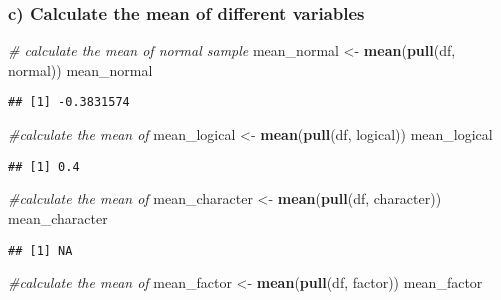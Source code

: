 \documentclass[
]{article}
\newenvironment{Shaded}{\begin{snugshade}}{\end{snugshade}}
\newcommand{\CommentTok}[1]{\textcolor[rgb]{0.56,0.35,0.01}{\textit{#1}}}
\newcommand{\FunctionTok}[1]{\textcolor[rgb]{0.13,0.29,0.53}{\textbf{#1}}}
\newcommand{\NormalTok}[1]{#1}
\newcommand{\OtherTok}[1]{\textcolor[rgb]{0.56,0.35,0.01}{#1}}
\begin{document}
\subsubsection{c) Calculate the mean of different
variables}\label{c-calculate-the-mean-of-different-variables}

\begin{Shaded}
\begin{Highlighting}[]
\CommentTok{\# calculate the mean of normal sample}
\NormalTok{mean\_normal }\OtherTok{\textless{}{-}} \FunctionTok{mean}\NormalTok{(}\FunctionTok{pull}\NormalTok{(df, normal))}
\NormalTok{mean\_normal}
\end{Highlighting}
\end{Shaded}

\begin{verbatim}
## [1] -0.3831574
\end{verbatim}

\begin{Shaded}
\begin{Highlighting}[]
\CommentTok{\#calculate the mean of }
\NormalTok{mean\_logical }\OtherTok{\textless{}{-}} \FunctionTok{mean}\NormalTok{(}\FunctionTok{pull}\NormalTok{(df, logical))}
\NormalTok{mean\_logical}
\end{Highlighting}
\end{Shaded}

\begin{verbatim}
## [1] 0.4
\end{verbatim}

\begin{Shaded}
\begin{Highlighting}[]
\CommentTok{\#calculate the mean of }
\NormalTok{mean\_character }\OtherTok{\textless{}{-}} \FunctionTok{mean}\NormalTok{(}\FunctionTok{pull}\NormalTok{(df, character))}
\NormalTok{mean\_character}
\end{Highlighting}
\end{Shaded}

\begin{verbatim}
## [1] NA
\end{verbatim}

\begin{Shaded}
\begin{Highlighting}[]
\CommentTok{\#calculate the mean of }
\NormalTok{mean\_factor }\OtherTok{\textless{}{-}} \FunctionTok{mean}\NormalTok{(}\FunctionTok{pull}\NormalTok{(df, factor))}
\NormalTok{mean\_factor}
\end{Highlighting}
\end{Shaded}
\end{document}
